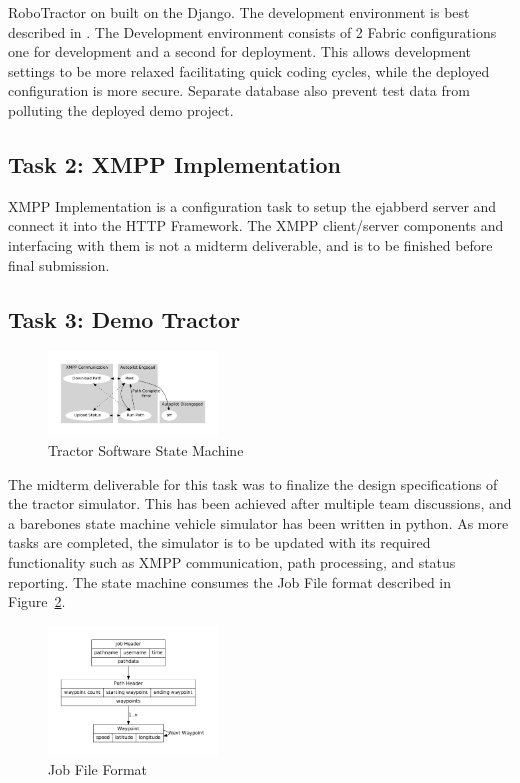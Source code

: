 \documentclass[conference,12pt]{IEEEtran}
\begin{document}
RoboTractor on built on the Django. The development environment is best
described in \autocite{_django_2014}. The Development environment consists of
2 Fabric configurations one for development and a second for deployment. This
  allows development settings to be more relaxed facilitating quick coding
  cycles, while the deployed configuration is more secure. Separate database
  also prevent test data from polluting the deployed demo project.

\subsection{Task 2: XMPP Implementation}
XMPP Implementation is a configuration task to setup the ejabberd server and
connect it into the HTTP Framework. The XMPP client/server components and
interfacing with them is not a midterm deliverable, and is to be finished before
final submission.

\subsection{Task 3: Demo Tractor}

\begin{figure}
\centering
\includegraphics[width=0.4\textwidth]{machine.pdf}
\caption{Tractor Software State Machine}
\label{fig:tractorstatemachine}
\end{figure}
The midterm deliverable for this task was to finalize the design specifications
of the tractor simulator. This has been achieved after multiple team
discussions, and a barebones state machine vehicle simulator has been written in
python. As more tasks are completed, the simulator is to be updated with its
required functionality such as XMPP communication, path processing, and status
reporting. The state machine consumes the Job File format described in
Figure~\ref{fig:jobfile}.  

\begin{figure}
\centering
\includegraphics[width=0.4\textwidth]{job_file.pdf}
\caption{Job File Format}
\label{fig:jobfile}
\end{figure}
\end{document}
